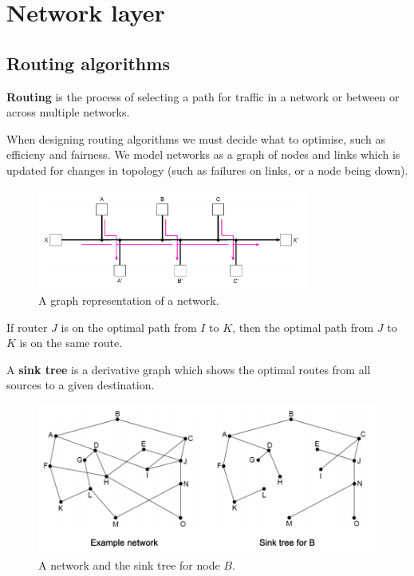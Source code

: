 \chapter{Network layer}
\section{Routing algorithms}

\begin{definition}[Routing]
    \textbf{Routing} is the process of selecting a path for traffic in a network or between or across multiple networks.
\end{definition}

When designing routing algorithms we must decide what to optimise, such as efficieny and fairness. We model networks as a graph of nodes and links which is updated for changes in topology (such as failures on links, or a node being down).

\begin{figure}
    \centering
    \includegraphics[width = 0.8\textwidth]{images/network-as-graph.png}
    \caption{A graph representation of a network.}
\end{figure}

\begin{proposition}
    If router $J$ is on the optimal path from $I$ to $K$, then the optimal path from $J$ to $K$ is on the same route.
\end{proposition}

\begin{definition}
    A \textbf{sink tree} is a derivative graph which shows the optimal routes from all sources to a given destination.
\end{definition}

\begin{figure}
    \centering
    \includegraphics[width=0.8\linewidth]{images/sink-tree.png}
    \caption{A network and the sink tree for node $B$.}
\end{figure}

